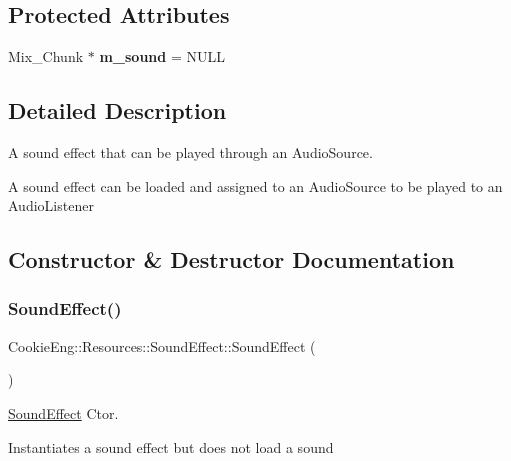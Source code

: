 \subsection*{Protected Attributes}
\begin{DoxyCompactItemize}
\item 
\mbox{\label{class_cookie_eng_1_1_resources_1_1_sound_effect_a32daaf5db5cfdfe15d08a9964e0da682}} 
Mix\+\_\+\+Chunk $\ast$ {\bfseries m\+\_\+sound} = N\+U\+LL
\end{DoxyCompactItemize}


\subsection{Detailed Description}
A sound effect that can be played through an Audio\+Source. 

A sound effect can be loaded and assigned to an Audio\+Source to be played to an Audio\+Listener 

\subsection{Constructor \& Destructor Documentation}
\mbox{\label{class_cookie_eng_1_1_resources_1_1_sound_effect_a7764233aa4404ea4991961ecf48bfde4}} 
\subsubsection{\texorpdfstring{Sound\+Effect()}{SoundEffect()}\hspace{0.1cm}{\footnotesize\ttfamily [1/2]}}
{\footnotesize\ttfamily Cookie\+Eng\+::\+Resources\+::\+Sound\+Effect\+::\+Sound\+Effect (\begin{DoxyParamCaption}{ }\end{DoxyParamCaption})}



\hyperlink{class_cookie_eng_1_1_resources_1_1_sound_effect}{Sound\+Effect} Ctor. 

Instantiates a sound effect but does not load a sound \mbox{\label{class_cookie_eng_1_1_resources_1_1_sound_effect_a57ef9e03fcedaa554b17132ead52153d}} 
